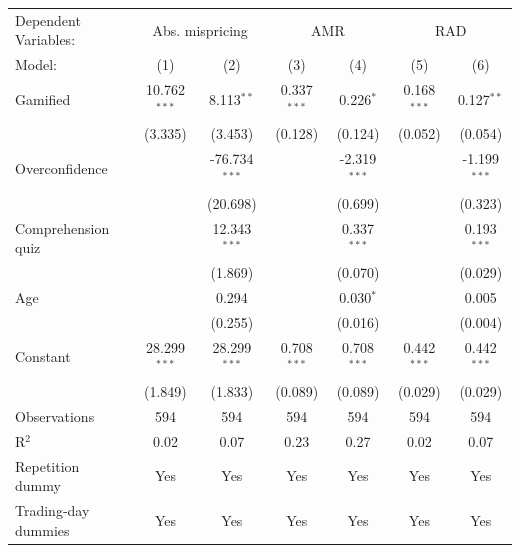 \begin{tabular}{lcccccc}
   \tabularnewline \midrule \midrule
   Dependent Variables: & \multicolumn{2}{c}{Abs. mispricing} & \multicolumn{2}{c}{AMR} & \multicolumn{2}{c}{RAD}\\
   Model:              & (1)            & (2)             & (3)           & (4)            & (5)           & (6)\\  
   \midrule
   Gamified            & 10.762$^{***}$ & 8.113$^{**}$    & 0.337$^{***}$ & 0.226$^{*}$    & 0.168$^{***}$ & 0.127$^{**}$\\   
                       & (3.335)        & (3.453)         & (0.128)       & (0.124)        & (0.052)       & (0.054)\\   
   Overconfidence      &                & -76.734$^{***}$ &               & -2.319$^{***}$ &               & -1.199$^{***}$\\   
                       &                & (20.698)        &               & (0.699)        &               & (0.323)\\   
   Comprehension quiz  &                & 12.343$^{***}$  &               & 0.337$^{***}$  &               & 0.193$^{***}$\\   
                       &                & (1.869)         &               & (0.070)        &               & (0.029)\\   
   Age                 &                & 0.294           &               & 0.030$^{*}$    &               & 0.005\\   
                       &                & (0.255)         &               & (0.016)        &               & (0.004)\\   
   Constant            & 28.299$^{***}$ & 28.299$^{***}$  & 0.708$^{***}$ & 0.708$^{***}$  & 0.442$^{***}$ & 0.442$^{***}$\\   
                       & (1.849)        & (1.833)         & (0.089)       & (0.089)        & (0.029)       & (0.029)\\   
   \midrule
   Observations        & 594            & 594             & 594           & 594            & 594           & 594\\  
   R$^2$               & 0.02           & 0.07            & 0.23          & 0.27           & 0.02          & 0.07\\  
   Repetition dummy    & Yes            & Yes             & Yes           & Yes            & Yes           & Yes\\  
   Trading-day dummies & Yes            & Yes             & Yes           & Yes            & Yes           & Yes\\  
   \midrule \midrule
\end{tabular}
